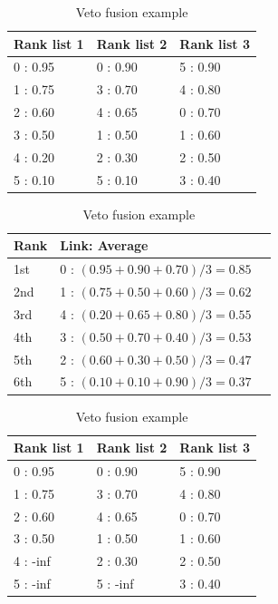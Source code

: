 \begin{table}
  \centering
  \caption{Veto fusion example}
  \label{tab:veto_example}

  \begin{tabular}{l l l}
    \toprule
    Rank list 1 & Rank list 2 & Rank list 3 \\
    \midrule
    0 : 0.95    & 0 : 0.90    & 5 : 0.90 \\
    1 : 0.75    & 3 : 0.70    & 4 : 0.80 \\
    2 : 0.60    & 4 : 0.65    & 0 : 0.70 \\
    3 : 0.50    & 1 : 0.50    & 1 : 0.60 \\
    4 : 0.20    & 2 : 0.30    & 2 : 0.50 \\
    5 : 0.10    & 5 : 0.10    & 3 : 0.40 \\
    \bottomrule
  \end{tabular}

  \vspace{0.5cm}

  \begin{tabular}{l l l}
    \toprule
    Rank & Link: Average \\
    \midrule
    1st & 0 : $(0.95 + 0.90 + 0.70)/3 = 0.85$ \\
    2nd & 1 : $(0.75 + 0.50 + 0.60)/3 = 0.62$ \\
    3rd & 4 : $(0.20 + 0.65 + 0.80)/3 = 0.55$ \\
    4th & 3 : $(0.50 + 0.70 + 0.40)/3 = 0.53$ \\
    5th & 2 : $(0.60 + 0.30 + 0.50)/3 = 0.47$ \\
    6th & 5 : $(0.10 + 0.10 + 0.90)/3 = 0.37$ \\
    \bottomrule
  \end{tabular}

  \vspace{0.5cm}

  \begin{tabular}{l l l}
    \toprule
    Rank list 1 & Rank list 2 & Rank list 3 \\
    \midrule
    0 : 0.95    & 0 : 0.90    & 5 : 0.90 \\
    1 : 0.75    & 3 : 0.70    & 4 : 0.80 \\
    2 : 0.60    & 4 : 0.65    & 0 : 0.70 \\
    3 : 0.50    & 1 : 0.50    & 1 : 0.60 \\
    4 : -inf    & 2 : 0.30    & 2 : 0.50 \\
    5 : -inf    & 5 : -inf    & 3 : 0.40 \\
    \bottomrule
  \end{tabular}


\end{table}

